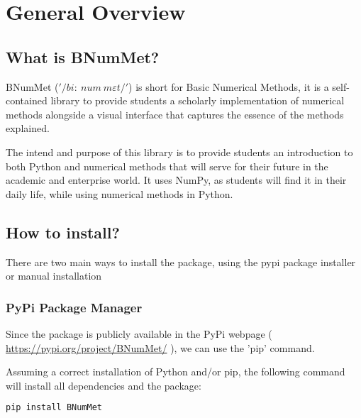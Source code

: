 \section*{General Overview}
\subsection*{What is BNumMet?}
BNumMet ($'/bi:\ num\ m\varepsilon t/'$) is short for Basic Numerical Methods, it is a self-contained library to provide students a scholarly implementation of numerical methods alongside a visual interface that captures the essence of the methods explained.

The intend and purpose of this library is to provide students an introduction to both Python and numerical methods that will serve for their future in the academic and enterprise world. It uses NumPy, as students will find it in their daily life, while using numerical methods in Python. 



\subsection*{How to install?}
There are two main ways to install the package, using the pypi package installer or manual installation
\subsubsection*{PyPi Package Manager}
Since the package is publicly available in the PyPi webpage ( \href{https://pypi.org/project/BNumMet/}{https://pypi.org/project/BNumMet/} ), we can use the 'pip' command.

Assuming a correct installation of Python and/or pip, the following command will install all dependencies and the package:
\begin{lstlisting}[language=Python]
pip install BNumMet
\end{lstlisting}


